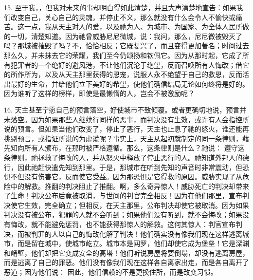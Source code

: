 15. 至于我，，但我对未来的事却明白得如此清楚，并且大声清楚地宣告：如果我们改变自己，关心自己的灵魂，并停止不义，那么就没有什么会令人不愉快或痛苦。这一点，我从天主对人的爱，以及祂为人、为城市、为国家、为全体人民所做的一切，清楚知道。因为祂曾威胁尼尼微城，说：我问，那么，尼尼微被毁灭了吗？那城被摧毁了吗？不，恰恰相反；它既复兴了，而且变得更加著名；时间过去那么久，并未抹去它的荣耀，我们至今仍颂扬和钦佩它。因为从那时起，它成了所有犯罪者的一个绝好的避风港，不让他们沉沦于绝望，反而召唤所有人悔改；借它的所作所为，以及从天主那里获得的恩宠，说服人永不绝望于自己的救恩，反而活出最好的生命，并给他们立下美好的希望，使他们确信结局无论如何终将是好的。因为谁听了这样的榜样，即使是最懒惰的人，岂会不被激励呢？\par

16. 天主甚至宁愿自己的预言落空，好使城市不致倾覆。或者更确切地说，预言并未落空。因为如果那些人继续行同样的恶事，而判决没有生效，或许有人会指控所说的预言。但如果当他们改变了，停止了恶行，天主也止息了祂的怒火，谁还能再挑剔预言，或指证所说的为虚谎呢？事实上，天主从起初就制定的同一条律则，藉先知向所有人颁布，在那时被严格遵循。那么，这条律则是什么？祂说：  遵守这条律则，祂拯救了悔改的人，并从怒火中释放了停止恶行的人。祂知道外邦人的德行，因此祂赶快遣先知到那里。于是，那城市在听到先知的声音时非常震动，但恐惧不但没有伤害它，反而使它受益。因为那恐惧是它得救的原因。威胁实现了从危险中的解救。推翻的判决阻止了推翻。啊，多么奇异惊人！威胁死亡的判决却带来了生命！判决公布后竟被取消，与世间的判官完全相反！因为在他们那里，宣布判决使它生效，完全确立；但相反，在天主那里，公布判决却使它被取消。因为如果判决没有被公布，犯罪的人就不会听到；如果他们没有听到，就不会悔改；如果没有悔改，就不能避免惩罚，也不能获得那惊人的解救。这何其惊人：判官宣布判决，而被判罪的人以自己的悔改化解了判决！他们确实没有像我们现在这样逃离城市，而是留在城中，使城市屹立。城市本是网罗，他们却使它成为堡垒！它是深渊和峭壁，他们却把它变成安全的高塔！他们听说房屋将要倒塌，却没有逃离房屋，而是逃离了自己的罪恶。他们没有像我们现在这样各自离家出走，而是各自离开了恶道；因为他们说： 因此，他们信赖的不是更换住所，而是改变习惯。\par

